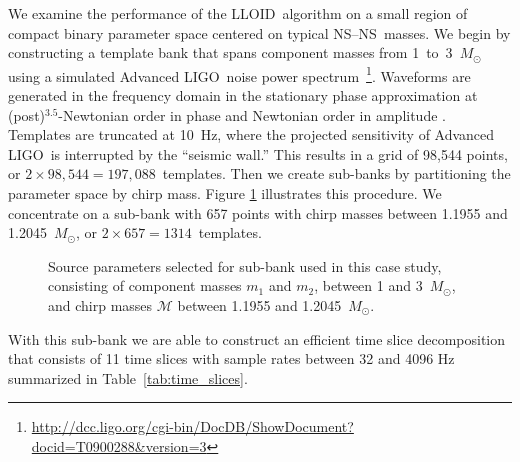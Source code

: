 \documentclass[preprint2]{aastex}
\newcommand{\NS}{NS}
\newcommand{\LIGO}{LIGO}%
\newcommand{\lloid}{LLOID}%
\begin{document}
We examine the performance of the \lloid\ algorithm on a small region of
compact binary parameter space centered on typical \NS--\NS\
masses.  We begin by constructing a template bank that spans component masses
from 1~to~3~$M_\odot$ using a simulated Advanced \LIGO\ noise
power spectrum~\citep{ALIGONoise}\footnote{\url{http://dcc.ligo.org/cgi-bin/DocDB/ShowDocument?docid=T0900288&version=3}}.  Waveforms are generated in the frequency domain in the stationary phase approximation at (post)$^{3.5}$-Newtonian order in phase and Newtonian order in amplitude \citep[the TaylorF2 waveforms described in][]{TaylorF2}.  Templates are truncated at 10~Hz, where the projected
sensitivity of Advanced \LIGO\ is interrupted by the ``seismic wall.''
This results in a grid of 98,544 points, or
$2 \times 98,544 = 197,088$~templates.  Then we create sub-banks by partitioning
the parameter space by chirp mass.  Figure \ref{fig:tmpltbank} illustrates this
procedure. We concentrate on a sub-bank with 657 points with chirp masses
between 1.1955 and 1.2045~$M_\odot$, or $2 \times 657 = 1314$~templates.
\begin{figure}[h]
	\caption{\label{fig:tmpltbank}Source parameters selected for sub-bank used in this
case study, consisting of component masses $m_1$ and $m_2$, between 1 and 3~$M_\odot$, and
chirp masses $\mathcal{M}$ between 1.1955 and 1.2045~$M_\odot$.}
\end{figure}
With this sub-bank we are able to construct an efficient time slice decomposition
that consists of 11 time slices with sample rates between 32 and 4096 Hz summarized
in Table~\ref{tab:time_slices}.
\end{document}
